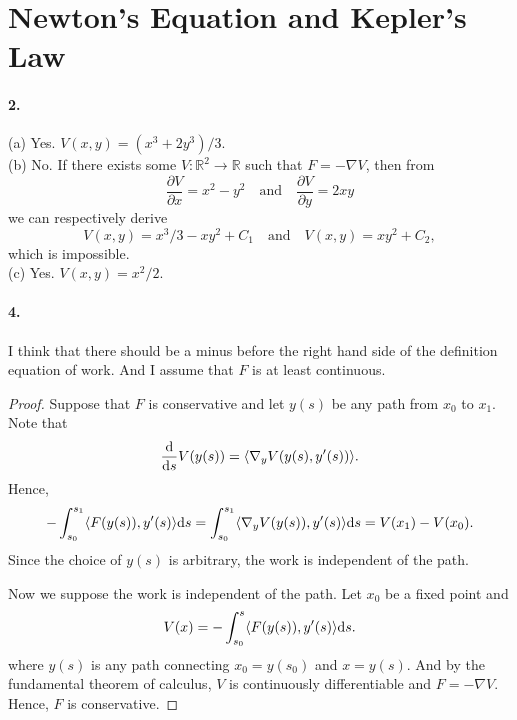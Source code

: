 \section{Newton's Equation and Kepler's Law}

\paragraph{2.}
\begin{solution}
  $\,$\\
  (a) Yes. $V(x, y)=(x^3+2y^3)/3$. \\
  (b) No. If there exists some $V:\mathbb{R}^2\to\mathbb{R}$ such that $F = 
      -\nabla V$, then from 
      \[
        \frac{\partial V}{\partial x} = x^2-y^2
        \quad\text{and}\quad
        \frac{\partial V}{\partial y} = 2xy 
      \]
      we can respectively derive
      \[
        V(x,y)=x^3/3-xy^2+C_1 \quad\text{and}\quad V(x,y)=xy^2 + C_2,
      \]
      which is impossible.\\
  (c) Yes. $V(x, y)=x^2/2$.
\end{solution}

\paragraph{4.}
  I think that there should be a minus before the right hand side of the 
  definition equation of work. And I assume that $F$ is at least continuous.
\begin{proof}
  Suppose that $F$ is conservative and let $y(s)$ be any path from $x_0$ to 
  $x_1$. Note that 
  \[
    \frac{\mathrm{d}}{\mathrm{d} s}V(y(s)) = \langle \nabla_yV(y(s), y^\prime(s)) \rangle.
  \]
  Hence,
  \[
    -\int_{s_0}^{s_1}\langle F(y(s)), y^\prime(s)\rangle \mathrm{d} s = 
    \int_{s_0}^{s_1}\langle \nabla_yV(y(s)), y^\prime(s)\rangle \mathrm{d} s =
    V(x_1)-V(x_0).
  \]
  Since the choice of $y(s)$ is arbitrary, the work is independent of the path.
  \par
  Now we suppose the work is independent of the path. Let $x_0$ be a fixed point
  and 
  \[
    V(x) = -\int_{s_0}^{s}\langle F(y(s)), y^\prime(s)\rangle \mathrm{d} s.
  \]
  where $y(s)$ is any path connecting $x_0 = y(s_0)$ and $x = y(s)$. And by the
  fundamental theorem of calculus, $V$ is continuously differentiable and $F=
  -\nabla V$. Hence, $F$ is conservative.
\end{proof}

